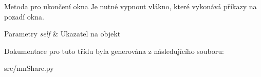 Metoda pro ukončení okna Je nutné vypnout vlákno, které vykonává příkazy na pozadí okna. 


\begin{DoxyParams}{Parametry}
{\em self} & Ukazatel na objekt \\
\hline
\end{DoxyParams}


Dokumentace pro tuto třídu byla generována z následujícího souboru\-:\begin{DoxyCompactItemize}
\item 
src/mn\-Share.\-py\end{DoxyCompactItemize}
